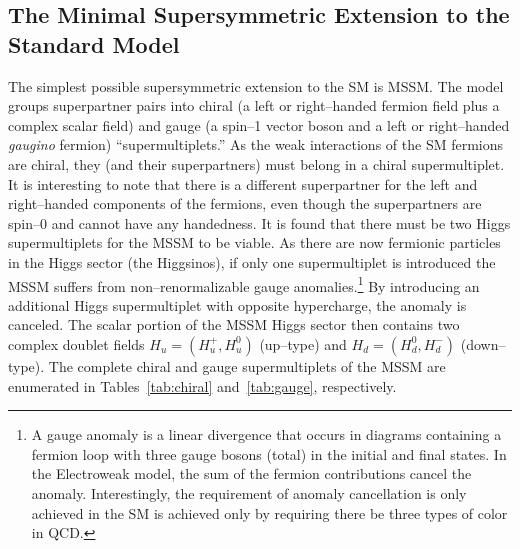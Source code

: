 \subsection{The Minimal Supersymmetric Extension to the Standard Model}
\label{sec:MSSMAndTaus} The simplest possible supersymmetric extension to the
SM is MSSM\@.  The model groups
superpartner pairs into chiral (a left or right--handed fermion field plus a
complex scalar field) and gauge (a spin--1 vector boson and a left or
right--handed \emph{gaugino} fermion) ``supermultiplets.''  As the weak
interactions of the SM fermions are chiral, they (and their
superpartners) must belong in a chiral supermultiplet.  It is interesting to
note that there is a different superpartner for the left and right--handed
components of the fermions, even though the superpartners are spin--0 and cannot
have any handedness. It is found that there must be two Higgs supermultiplets
for the MSSM to be viable.  As there are now fermionic particles in the Higgs
sector (the Higgsinos), if only one supermultiplet is introduced the MSSM suffers
from non--renormalizable gauge anomalies.\footnote{A gauge anomaly is a linear
divergence that occurs in diagrams containing a fermion loop with three gauge
bosons (total) in the initial and final states.  In the Electroweak model, the
sum of the fermion contributions cancel the anomaly.  Interestingly, the
requirement of anomaly cancellation is only achieved in the SM is achieved only
by requiring there be three types of color in QCD.}  By introducing an
additional Higgs supermultiplet with opposite hypercharge, the anomaly is
canceled. The scalar portion of the MSSM Higgs sector then contains two complex
doublet fields $H_u = (H^+_u, H^0_u)$ (up--type) and $H_d = (H^0_d, H^-_d)$
(down--type).  The complete chiral and gauge supermultiplets of the MSSM are
enumerated in Tables~\ref{tab:chiral} and~\ref{tab:gauge}, respectively.
\renewcommand{\arraystretch}{1.4}
